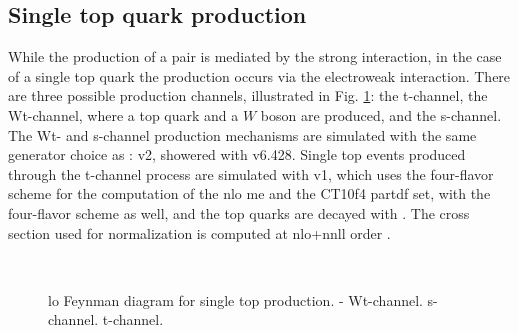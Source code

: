 \subsection{Single top quark production}

While the production of a \ttbar pair is mediated by the strong interaction, in the case of a single top quark the production occurs via the electroweak interaction. 
There are three possible production channels, illustrated in Fig. \ref{fig:single_top_prod}: the t-channel, the Wt-channel, where a top quark and a $W$ boson are produced, and the s-channel. 
The Wt- and s-channel production mechanisms are simulated with the same generator choice as \ttbar: \PowhegBox v2, showered with \PY v6.428.
Single top events produced through the t-channel process are simulated with \PowhegBox v1, which uses the four-flavor scheme for the computation of the \gls{nlo} \gls{me} and the CT10f4 \gls{partdf} set, with the four-flavor scheme as well, and the top quarks are decayed with \MadSpin \cite{Artoisenet:2012st}.
The cross section used for normalization is computed at \gls{nlo}+\gls{nnll} order 
\cite{Kidonakis:2011wy,Kidonakis:2010ux,Kidonakis:2010tc}.

\begin{figure}[h]
\centering 
{}
 \\
\caption{\Gls{lo} Feynman diagram for single top production. - Wt-channel. 
 s-channel.  t-channel.}\label{fig:single_top_prod}
\end{figure}

